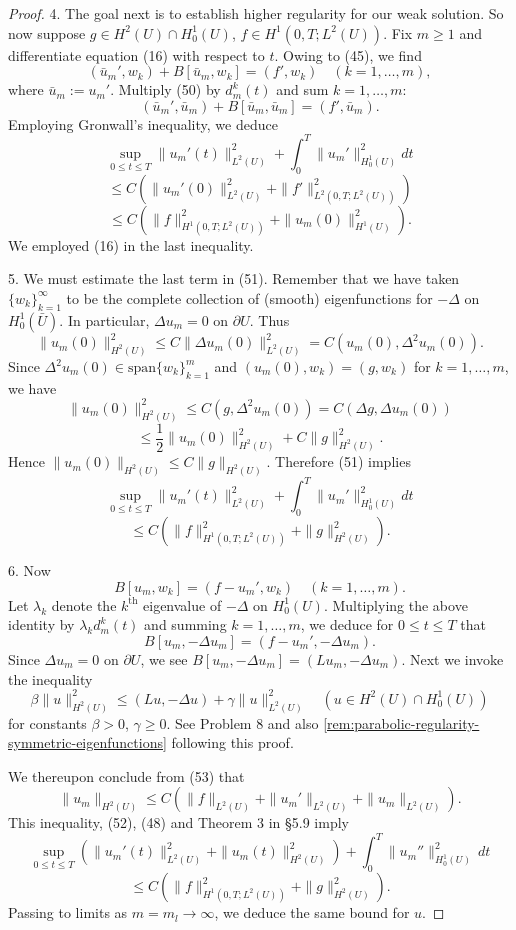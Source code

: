 \begin{proof}
4. The goal next is to establish higher regularity for our weak solution. So now suppose $g \in H^2(U) \cap H^1_0(U)$, $f \in H^1(0,T;L^2(U))$. Fix $m \geq 1$ and differentiate equation (16) with respect to $t$. Owing to (45), we find
\[
(\bar u_m', w_k) + B[\bar u_m, w_k] = (f', w_k) \quad (k = 1, \ldots, m),
\tag{50}
\]
where $\bar u_m := u_m'$. Multiply (50) by $d^k_m(t)$ and sum $k = 1, \ldots, m$:
\[
(\bar u_m', \bar u_m) + B[\bar u_m, \bar u_m] = (f', \bar u_m).
\]
Employing Gronwall's inequality, we deduce
\[
\sup_{0 \leq t \leq T} \|u_m'(t)\|^2_{L^2(U)} + \int_0^T \|u_m'\|^2_{H^1_0(U)} dt
\]
\[
\leq C(\|u_m'(0)\|^2_{L^2(U)} + \|f'\|^2_{L^2(0,T;L^2(U))})
\]
\[
\leq C(\|f\|^2_{H^1(0,T;L^2(U))} + \|u_m(0)\|^2_{H^1(U)}).
\tag{51}
\]
We employed (16) in the last inequality.

5. We must estimate the last term in (51). Remember that we have taken $\{w_k\}^\infty_{k=1}$ to be the complete collection of (smooth) eigenfunctions for $-\Delta$ on $H^1_0(\bar{U})$. In particular, $\Delta u_m = 0$ on $\partial U$. Thus
\[
\|u_m(0)\|^2_{H^2(U)} \leq C\|\Delta u_m(0)\|^2_{L^2(U)} = C(u_m(0), \Delta^2 u_m(0)).
\]
Since $\Delta^2 u_m(0) \in \text{span}\{w_k\}^m_{k=1}$ and $(u_m(0), w_k) = (g, w_k)$ for $k = 1, \ldots, m$, we have
\[
\|u_m(0)\|^2_{H^2(U)} \leq C(g, \Delta^2 u_m(0)) = C(\Delta g, \Delta u_m(0))
\]
\[
\leq \frac{1}{2}\|u_m(0)\|^2_{H^2(U)} + C\|g\|^2_{H^2(U)}.
\]
Hence $\|u_m(0)\|_{H^2(U)} \leq C\|g\|_{H^2(U)}$. Therefore (51) implies
\[
\sup_{0 \leq t \leq T} \|u_m'(t)\|^2_{L^2(U)} + \int_0^T \|u_m'\|^2_{H^1_0(U)} dt
\]
\[
\leq C(\|f\|^2_{H^1(0,T;L^2(U))} + \|g\|^2_{H^2(U)}).
\tag{52}
\]

6. Now
\[
B[u_m, w_k] = (f - u_m', w_k) \quad (k = 1, \ldots, m).
\]
Let $\lambda_k$ denote the $k^{\text{th}}$ eigenvalue of $-\Delta$ on $H^1_0(U)$. Multiplying the above identity by $\lambda_k d^k_m(t)$ and summing $k = 1, \ldots, m$, we deduce for $0 \leq t \leq T$ that
\[
B[u_m, -\Delta u_m] = (f - u_m', -\Delta u_m).
\tag{53}
\]
Since $\Delta u_m = 0$ on $\partial U$, we see $B[u_m, -\Delta u_m] = (Lu_m, -\Delta u_m)$. Next we invoke the inequality
\[
\beta\|u\|_{H^2(U)}^2 \leq (Lu, -\Delta u) + \gamma\|u\|_{L^2(U)}^2 \quad (u \in H^2(U) \cap H_0^1(U))
\tag{54}
\]
for constants $\beta > 0$, $\gamma \geq 0$. See Problem 8 and also \cref{rem:parabolic-regularity-symmetric-eigenfunctions} following this proof.

We thereupon conclude from (53) that
\[
\|u_m\|_{H^2(U)} \leq C(\|f\|_{L^2(U)} + \|u_m'\|_{L^2(U)} + \|u_m\|_{L^2(U)}).
\]
This inequality, (52), (48) and Theorem 3 in \S5.9 imply
\[
\sup_{0 \leq t \leq T} (\|u_m'(t)\|_{L^2(U)}^2 + \|u_m(t)\|_{H^2(U)}^2) + \int_0^T \|u_m''\|_{H_0^1(U)}^2 \, dt
\]
\[
\leq C(\|f\|_{H^1(0,T;L^2(U))}^2 + \|g\|_{H^2(U)}^2).
\]
Passing to limits as $m = m_l \to \infty$, we deduce the same bound for $u$.


\end{proof}
